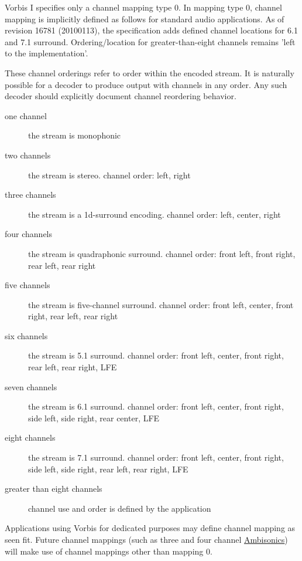 Vorbis I specifies only a channel mapping type 0.  In mapping type 0,
channel mapping is implicitly defined as follows for standard audio
applications. As of revision 16781 (20100113), the specification adds
defined channel locations for 6.1 and 7.1 surround.  Ordering/location
for greater-than-eight channels remains 'left to the implementation'.

These channel orderings refer to order within the encoded stream.  It
is naturally possible for a decoder to produce output with channels in
any order. Any such decoder should explicitly document channel
reordering behavior.

\begin{description} %
 \item[one channel]
	the stream is monophonic

\item[two channels]
	the stream is stereo.  channel order: left, right

\item[three channels]
	the stream is a 1d-surround encoding.  channel order: left,
center, right

\item[four channels]
	the stream is quadraphonic surround.  channel order: front left,
front right, rear left, rear right

\item[five channels]
	the stream is five-channel surround.  channel order: front left,
center, front right, rear left, rear right

\item[six channels]
	the stream is 5.1 surround.  channel order: front left, center, 
front right, rear left, rear right, LFE

\item[seven channels]
        the stream is 6.1 surround.  channel order: front left, center, 
front right, side left, side right, rear center, LFE

\item[eight channels]
        the stream is 7.1 surround.  channel order: front left, center, 
front right, side left, side right, rear left, rear right, 
LFE

\item[greater than eight channels]
	channel use and order is defined by the application

\end{description}

Applications using Vorbis for dedicated purposes may define channel
mapping as seen fit.  Future channel mappings (such as three and four
channel \href{http://www.ambisonic.net/}{Ambisonics}) will
make use of channel mappings other than mapping 0.



